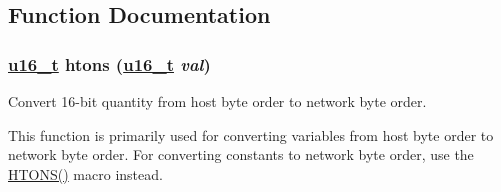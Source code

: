 \subsection{Function Documentation}
\hypertarget{a00065_ga22b04cac8cf283ca12f028578bebc06}{
\subsubsection[htons]{\setlength{\rightskip}{0pt plus 5cm}\hyperlink{a00070_gfc6499c1f28697aa3bfc2804d496fd11}{u16\_\-t} htons (\hyperlink{a00070_gfc6499c1f28697aa3bfc2804d496fd11}{u16\_\-t} {\em val})}}
\label{a00065_ga22b04cac8cf283ca12f028578bebc06}


Convert 16-bit quantity from host byte order to network byte order. 

This function is primarily used for converting variables from host byte order to network byte order. For converting constants to network byte order, use the \hyperlink{a00065_g69a7a4951ff21b302267532c21ee78fc}{HTONS()} macro instead. 